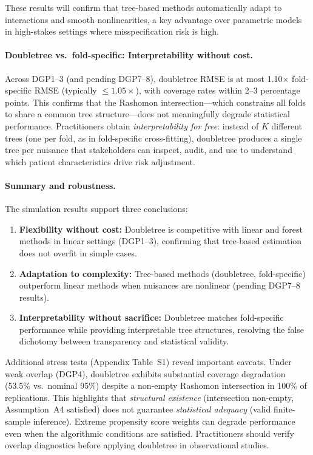 \documentclass[12pt]{article}
\begin{document}
These results will confirm that tree-based methods automatically adapt to interactions and smooth nonlinearities, a key advantage over parametric models in high-stakes settings where misspecification risk is high.

\paragraph{Doubletree vs.\ fold-specific: Interpretability without cost.}
Across DGP1--3 (and pending DGP7--8), doubletree RMSE is at most 1.10$\times$ fold-specific RMSE (typically $\le 1.05\times$), with coverage rates within 2--3 percentage points. This confirms that the Rashomon intersection---which constrains all folds to share a common tree structure---does not meaningfully degrade statistical performance. Practitioners obtain \emph{interpretability for free}: instead of $K$ different trees (one per fold, as in fold-specific cross-fitting), doubletree produces a single tree per nuisance that stakeholders can inspect, audit, and use to understand which patient characteristics drive risk adjustment.

\paragraph{Summary and robustness.}
The simulation results support three conclusions:
\begin{enumerate}[nosep]
\item \textbf{Flexibility without cost:} Doubletree is competitive with linear and forest methods in linear settings (DGP1--3), confirming that tree-based estimation does not overfit in simple cases.
\item \textbf{Adaptation to complexity:} Tree-based methods (doubletree, fold-specific) outperform linear methods when nuisances are nonlinear (pending DGP7--8 results).
\item \textbf{Interpretability without sacrifice:} Doubletree matches fold-specific performance while providing interpretable tree structures, resolving the false dichotomy between transparency and statistical validity.
\end{enumerate}

Additional stress tests (Appendix Table~S1) reveal important caveats. Under weak overlap (DGP4), doubletree exhibits substantial coverage degradation (53.5\% vs.\ nominal 95\%) despite a non-empty Rashomon intersection in 100\% of replications. This highlights that \emph{structural existence} (intersection non-empty, Assumption~A4 satisfied) does not guarantee \emph{statistical adequacy} (valid finite-sample inference). Extreme propensity score weights can degrade performance even when the algorithmic conditions are satisfied. Practitioners should verify overlap diagnostics before applying doubletree in observational studies.
\end{document}

